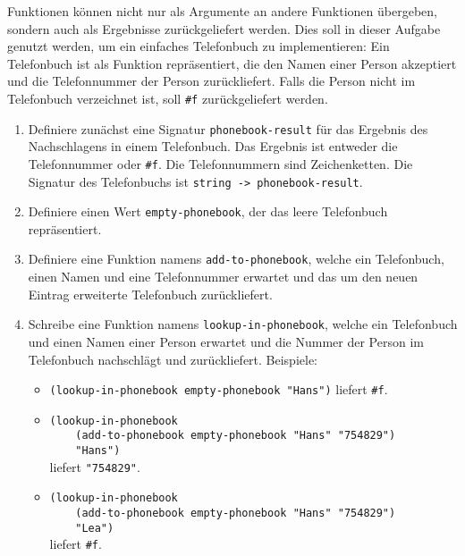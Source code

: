 \begin{aufgabe}
  Funktionen können nicht nur als Argumente an
  andere Funktionen übergeben, sondern auch als Ergebnisse
  zurückgeliefert werden. Dies soll in dieser Aufgabe genutzt werden,
  um ein einfaches Telefonbuch zu implementieren: Ein Telefonbuch ist
  als Funktion repräsentiert, die den Namen einer Person akzeptiert
  und die Telefonnummer der Person zurückliefert. Falls die Person
  nicht im Telefonbuch verzeichnet ist, soll \verb|#f| zurückgeliefert
  werden.

  \begin{enumerate}
  \item Definiere zunächst eine Signatur
    \verb"phonebook-result" für das Ergebnis des Nachschlagens in einem
    Telefonbuch. Das Ergebnis ist entweder die Telefonnummer oder
    \verb|#f|. Die Telefonnummern sind Zeichenketten.
    Die Signatur des Telefonbuchs ist  \verb"string -> phonebook-result".
  \item Definiere einen Wert \verb"empty-phonebook", der das leere
    Telefonbuch repräsentiert.
  \item Definiere eine Funktion namens
    \verb"add-to-phonebook", welche ein Telefonbuch, einen Namen
    und eine Telefonnummer erwartet und das um den neuen Eintrag
    erweiterte
    Telefonbuch zurückliefert.
  \item Schreibe eine Funktion namens \verb"lookup-in-phonebook",
    welche ein Telefonbuch und einen Namen einer Person erwartet und die
    Nummer der Person im Telefonbuch nachschlägt und zurückliefert.
    Beispiele:
    \begin{itemize}
    \item \verb|(lookup-in-phonebook empty-phonebook "Hans")| liefert
      \verb|#f|.
    \item \verb|(lookup-in-phonebook| \\
      \verb|    (add-to-phonebook empty-phonebook "Hans" "754829")|\\
      \verb|    "Hans")| \\
      liefert \verb|"754829"|.
    \item \verb|(lookup-in-phonebook|\\
      \verb|    (add-to-phonebook empty-phonebook "Hans" "754829")|\\
      \verb|    "Lea")|\\
      liefert \verb|#f|.
    \end{itemize}
  \end{enumerate}
\end{aufgabe}

